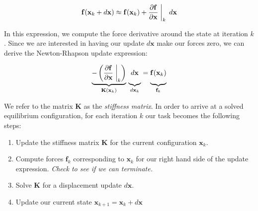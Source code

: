 \begin{equation}
  \mathbf f(\mathbf x_k + d\mathbf x) \approx \mathbf f(\mathbf x_k) +
  \frac{\partial \mathbf{f}}{\partial \mathbf x}\biggm|_k\,d\mathbf x
\end{equation}

In this expression, we compute the force derivative around the state
at iteration $k$. Since we are interested in having our update
$d\mathbf x$ make our forces zero, we can derive the Newton-Rhapson
update expression:

\begin{equation}
  \label{equ:newtonstep}
  \underbrace{- \left(\frac{\partial \mathbf{f}}{\partial \mathbf
      x}\biggm|_k\right)}_{\mathbf K(\mathbf x_k)}
\,\underbrace{\vphantom{- \left(\frac{\partial \mathbf{f}}{\partial \mathbf
      x}\biggm|_k\right)}d\mathbf x}_{d\mathbf x_k}
  = \underbrace{\vphantom{- \left(\frac{\partial \mathbf{f}}{\partial \mathbf
      x}\biggm|_k\right)}\mathbf f(\mathbf x_k)}_{\mathbf f_k}
\end{equation}

We refer to the matrix $\mathbf K$ as the \textit{stiffness
  matrix}. In order to arrive at a solved equilibrium configuration, for
each iteration $k$ our task becomes the following steps:

\begin{enumerate}
  \item Update the stiffness matrix $\mathbf K$ for the current
    configuration $\mathbf x_k$.
  \item Compute forces $\mathbf f_k$ corresponding to $\mathbf x_k$
    for our right hand side of the update expression. \textit{Check to
      see if we can terminate.}
  \item Solve $\mathbf K$ for a displacement update $d\mathbf x$.
  \item Update our current state $\mathbf x_{k+1} = \mathbf x_k +
    d\mathbf x$
  \end{enumerate}

